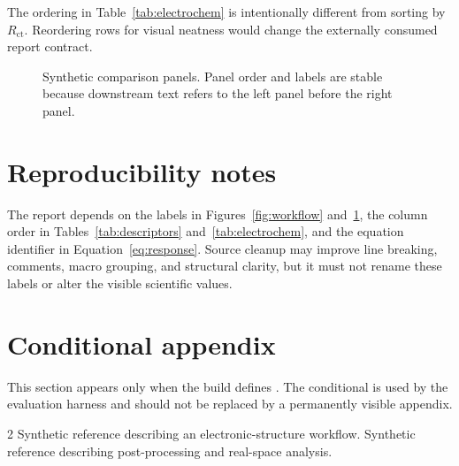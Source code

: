 \documentclass[10pt]{article}
\begin{document}
The ordering in Table~\ref{tab:electrochem} is intentionally different from sorting by $R_{\mathrm{ct}}$. Reordering rows for visual neatness would change the externally consumed report contract.

\begin{figure}[ht]
\centering
{}
\hfill
{}
\caption{Synthetic comparison panels. Panel order and labels are stable because downstream text refers to the left panel before the right panel.}
\label{fig:comparison}
\end{figure}

\section{Reproducibility notes}
\label{sec:reproducibility}

The report depends on the labels in Figures~\ref{fig:workflow} and~\ref{fig:comparison}, the column order in Tables~\ref{tab:descriptors} and~\ref{tab:electrochem}, and the equation identifier in Equation~\ref{eq:response}. Source cleanup may improve line breaking, comments, macro grouping, and structural clarity, but it must not rename these labels or alter the visible scientific values.

\ifdefined\SHOWAPPENDIX
\appendix
\section{Conditional appendix}
\label{sec:appendix}
This section appears only when the build defines \texttt{\string\SHOWAPPENDIX}. The conditional is used by the evaluation harness and should not be replaced by a permanently visible appendix.
\fi

\begin{thebibliography}{2}
Synthetic reference describing an electronic-structure workflow.
Synthetic reference describing post-processing and real-space analysis.
\end{thebibliography}
\end{document}
